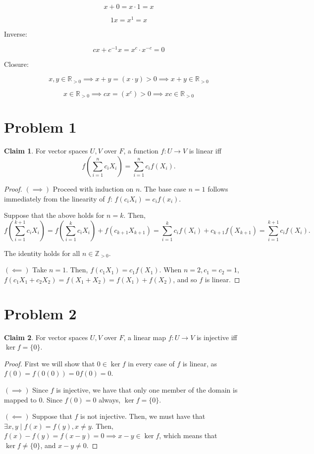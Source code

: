 \documentclass[12pt,letterpaper]{article}
\theoremstyle{definition}
\newtheorem*{claim}{Claim}
\newcommand{\Zg}{\mathbb{Z}_{>0}}
\newcommand{\Rg}{\mathbb{R}_{>0}}
\begin{document}
\[
  x + 0 = x \cdot 1 = x
\]

\[
  1x = x^1 = x
\]

Inverse:

\[
  cx + c^{-1}x = x^c\cdot x^{-c} = 0
\]

Closure:

\[
  x, y \in \Rg \implies x + y = (x \cdot y) > 0 \implies x + y \in \Rg
\]

\[
  x \in \Rg \implies cx = (x^c) > 0 \implies xc \in \Rg
\]

\section*{Problem 1}

\begin{claim}
  For vector spaces $U, V$ over $F$, a function $f: U \rightarrow V$ is linear
  iff
  \[
    f(\sum_{i=1}^nc_iX_i) = \sum_{i=1}^nc_if(X_i).
  \]
\end{claim}

\begin{proof}
  $(\implies)$ Proceed with induction on $n$. The base case $n = 1$ follows immediately
  from the linearity of $f$: $f(c_iX_i) = c_if(x_i)$.

  Suppose that the above holds for $n = k$. Then,
  \[
    f(\sum_{i=1}^{k+1}c_iX_i) =
    f(\sum_{i=1}^{k}c_iX_i) + f(c_{k+1}X_{k+1})= \sum_{i=1}^kc_if(X_i) +
    c_{k+1}f(X_{k+1}) = \sum_{i=1}^{k+1}c_if(X_i).
  \]

  The identity holds for all $n \in \Zg$.

  $(\impliedby)$ Take $n = 1$. Then, $f(c_1X_1) = c_1f(X_1)$. When $n = 2, c_1 =
  c_2 = 1$, $f(c_1X_1 + c_2X_2) = f(X_1 + X_2) = f(X_1) + f(X_2)$, and so $f$ is
  linear.
\end{proof}

\section*{Problem 2}

\begin{claim}
  For vector spaces $U, V$ over $F$, a linear map $f: U \rightarrow V$ is
  injective iff $\ker f = \{0\}$.
\end{claim}

\begin{proof}
  First we will show that $0 \in \ker f$ in every case of $f$ is linear, as
  $f(0) = f(0(0)) = 0f(0) = 0$.
  
  $(\implies)$ Since $f$ is injective, we have that only one member of the
  domain is mapped to $0$. Since $f(0) = 0$ always, $\ker f = \{0\}$.

  $(\impliedby)$ Suppose that $f$ is not injective. Then, we must have that
  $\exists x,y \mid f(x) = f(y), x \neq y$. Then, $f(x) - f(y) = f(x - y) = 0
  \implies x - y \in \ker f$, which means that $\ker f \neq \{0\}$, and $x - y
  \neq 0$. 
\end{proof}
\end{document}
